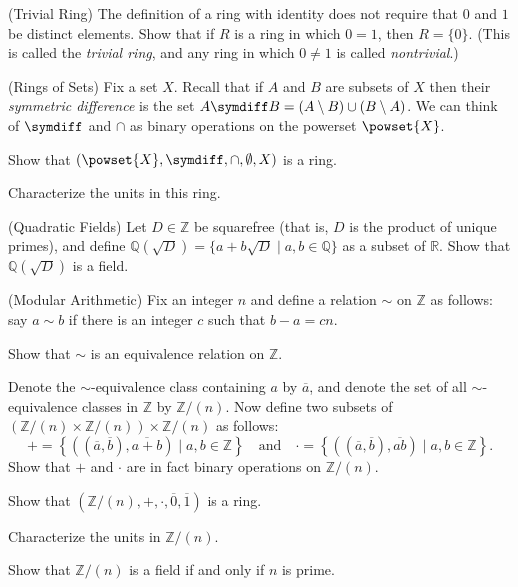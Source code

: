 \begin{exercises}
\item{\label{exr:trivial-ring}}%
(Trivial Ring) The definition of a ring with identity does not require that $0$ and $1$ be distinct elements. Show that if $R$ is a ring in which $0 = 1$, then $R = \{0\}$. (This is called the \emph{trivial ring}, and any ring in which $0 \neq 1$ is called \emph{nontrivial}.)

\item{\label{exr:rings-of-sets}}
(Rings of Sets) Fix a set $X$. Recall that if $A$ and $B$ are subsets of $X$ then their \emph{symmetric difference} is the set $A \symdiff B = (A \setminus B) \cup (B \setminus A)$. We can think of $\symdiff$ and $\cap$ as binary operations on the powerset $\powset{X}$.
\begin{enumerate*}
\item Show that $(\powset{X},\symdiff,\cap,\emptyset,X)$ is a ring.
\item Characterize the units in this ring.
\end{enumerate*}

\item{\label{exr:quadratic-fields}}
(Quadratic Fields) Let $D \in \mathbb{Z}$ be squarefree (that is, $D$ is the product of unique primes), and define $\mathbb{Q}(\sqrt{D}) = \{a+b\sqrt{D} \mid a,b \in \mathbb{Q}\}$ as a subset of $\mathbb{R}$. Show that $\mathbb{Q}(\sqrt{D})$ is a field.

\item
(Modular Arithmetic) Fix an integer $n$ and define a relation $\sim$ on $\mathbb{Z}$ as follows: say $a \sim b$ if there is an integer $c$ such that $b - a = cn$.
\begin{enumerate*}
\item Show that $\sim$ is an equivalence relation on $\mathbb{Z}$.
\item Denote the $\sim$-equivalence class containing $a$ by $\overline{a}$, and denote the set of all $\sim$-equivalence classes in $\mathbb{Z}$ by $\mathbb{Z}/(n)$. Now define two subsets of $(\mathbb{Z}/(n) \times \mathbb{Z}/(n)) \times \mathbb{Z}/(n)$ as follows: \[+ = \left\{ \left((\overline{a},\overline{b}),\overline{a+b}\right) \mid a,b \in \mathbb{Z} \right\} \quad \mathrm{and} \quad \cdot = \left\{ \left((\overline{a},\overline{b}),\overline{ab}\right) \mid a,b \in \mathbb{Z} \right\}.\] Show that $+$ and $\cdot$ are in fact binary operations on $\mathbb{Z}/(n)$.
\item Show that $(\mathbb{Z}/(n),+,\cdot,\overline{0},\overline{1})$ is a ring.
\item Characterize the units in $\mathbb{Z}/(n)$.
\item Show that $\mathbb{Z}/(n)$ is a field if and only if $n$ is prime.
\end{enumerate*}
\PauseExercises
\end{exercises}

